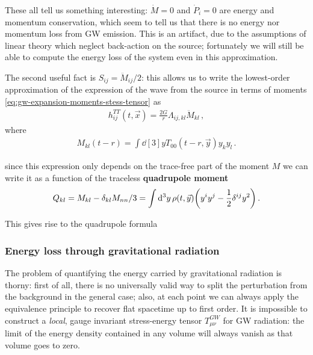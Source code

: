 \documentclass[main.tex]{subfiles}
\begin{document}
These all tell us something interesting: \(\dot{M} = 0\) and \(\dot{P}_{i} = 0\) are energy and momentum conservation, which seem to tell us that there is no energy nor momentum loss from \ac{GW} emission. 
This is an artifact, due to the assumptions of linear theory which neglect back-action on the source; fortunately we will still be able to compute the energy loss of the system even in this approximation.

The second useful fact is \(S_{ij} = \ddot{M}_{ij} / 2\): this allows us to write the lowest-order approximation of the expression of the wave from the source in terms of moments \eqref{eq:gw-expansion-moments-stess-tensor} as 
%
\begin{align}
h_{ij}^{TT}(t, \vec{x}) = \frac{2 G}{r} \Lambda_{ij, kl} \ddot{M}_{kl}
\,,
\end{align}
%
where 
%
\begin{align}
M_{kl}(t-r) = \int \dd[3]{y} T_{00}(t -r, \vec{y}) y_k y_l
\,.
\end{align}

since this expression only depends on the trace-free part of the moment \(M\) we can write it as a function of the traceless \textbf{quadrupole moment} 
%
\begin{align} \label{eq:quadrupole}
Q_{kl} = M_{kl} - \delta_{kl} M_{nn} / 3
= \int \dd[3]{y} \rho (t, \vec{y}) \qty(y^{i } y^{j} - \frac{1}{2} \delta^{ij} y^2)
\,.
\end{align}

This gives rise to the quadrupole formula 
%

\subsubsection{Energy loss through gravitational radiation}

The problem of quantifying the energy carried by gravitational radiation is thorny: first of all, there is no universally valid way to split the perturbation from the background in the general case; also, at each point we can always apply the equivalence principle to recover flat spacetime up to first order. 
It is impossible to construct a \emph{local}, gauge invariant stress-energy tensor \(T_{\mu \nu }^{GW}\) for \ac{GW} radiation: the limit of the energy density contained in any volume will always vanish as that volume goes to zero. 
\end{document}

